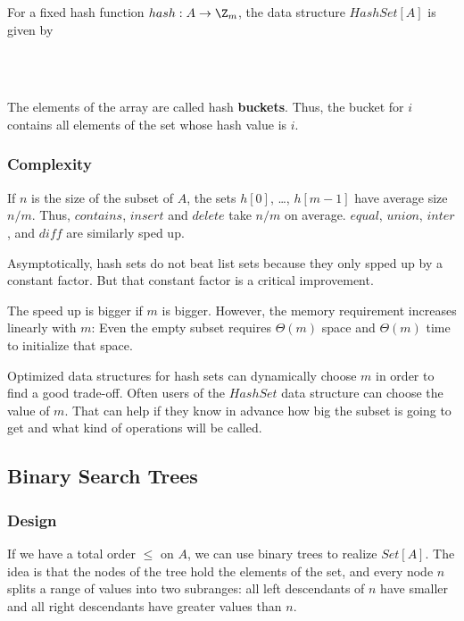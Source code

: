 For a fixed hash function $hash:A\to \Z_m$, the data structure $HashSet[A]$ is given by
\begin{acode}
\\
\\
\end{acode}
The elements of the array are called hash \textbf{buckets}.
Thus, the bucket for $i$ contains all elements of the set whose hash value is $i$.

\subsubsection{Complexity}
If $n$ is the size of the subset of $A$, the sets $h[0]$, \ldots, $h[m-1]$ have average size $n/m$.
Thus, $contains$, $insert$ and $delete$ take $n/m$ on average.
$equal$, $union$, $inter$, and $diff$ are similarly sped up.
\medskip

Asymptotically, hash sets do not beat list sets because they only spped up by a constant factor.
But that constant factor is a critical improvement.

The speed up is bigger if $m$ is bigger.
However, the memory requirement increases linearly with $m$: Even the empty subset requires $\Theta(m)$ space and $\Theta(m)$ time to initialize that space.

Optimized data structures for hash sets can dynamically choose $m$ in order to find a good trade-off.
Often users of the $HashSet$ data structure can choose the value of $m$.
That can help if they know in advance how big the subset is going to get and what kind of operations will be called.

\subsection{Binary Search Trees}\label{sec:ad:bst}

\subsubsection{Design}
If we have a total order $\leq$ on $A$, we can use binary trees to realize $Set[A]$.
The idea is that the nodes of the tree hold the elements of the set, and every node $n$ splits a range of values into two subranges: all left descendants of $n$ have smaller and all right descendants have greater values than $n$.

